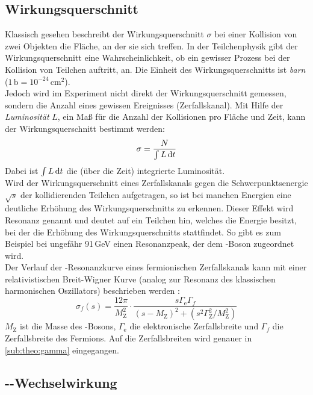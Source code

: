 \subsection{Wirkungsquerschnitt}
Klassisch gesehen beschreibt der Wirkungsquerschnitt $\sigma$ bei einer Kollision von zwei Objekten die Fläche, an der sie sich treffen.
In der Teilchenphysik gibt der Wirkungsquerschnitt eine Wahrscheinlichkeit, ob ein gewisser Prozess bei der Kollision von Teilchen auftritt, an.
Die Einheit des Wirkungsquerschnitts ist \emph{barn} ($1\,\text{b} = 10^{-24}\,\text{cm}^2$). \\
Jedoch wird im Experiment nicht direkt der Wirkungsquerschnitt gemessen, sondern die Anzahl eines gewissen Ereignisses (Zerfallskanal). Mit Hilfe
der \emph{Luminosität} $L$, ein Maß für die Anzahl der Kollisionen pro Fläche und Zeit, kann der Wirkungsquerschnitt bestimmt werden:
\begin{equation}
    \sigma = \frac{N}{\int L \, \mathrm{d} t}
\end{equation}
Dabei ist $\int L \, \mathrm{d} t$ die (über die Zeit) integrierte Luminosität. \\
Wird der Wirkungsquerschnitt eines Zerfallskanals gegen die Schwerpunktsenergie $\sqrt{s}$ der kollidierenden Teilchen aufgetragen, so ist
bei manchen Energien eine deutliche Erhöhung des Wirkungsquerschnitts zu erkennen. Dieser Effekt wird Resonanz genannt und deutet auf ein Teilchen
hin, welches die Energie besitzt, bei der die Erhöhung des Wirkungsquerschnitts stattfindet.
So gibt es zum Beispiel bei ungefähr 91\,GeV einen Resonanzpeak, der dem \Z-Boson zugeordnet wird. \\
Der Verlauf der  \Z-Resonanzkurve eines fermionischen Zerfallskanals kann mit einer relativistischen Breit-Wigner Kurve (analog zur Resonanz des
klassischen harmonischen Oszillators) beschrieben werden \cite{manual}:
\begin{equation}
    \label{eq:sigma:fermion}
    \sigma_f(s) = \frac{12 \pi}{M_\text{Z}^2} \cdot \frac{s \Gamma_\text{e} \Gamma_f}{ \left( s - M_\text{Z} \right)^2 + \left( s^2 \Gamma_\text{Z}^2 / M_\text{Z}^2 \right) }
\end{equation}
$M_\text{Z}$ ist die Masse des \Z-Bosons, $\Gamma_\text{e}$ die elektronische Zerfallsbreite und $\Gamma_f$ die Zerfallsbreite des Fermions. Auf
die Zerfallsbreiten wird genauer in \autoref{sub:theo:gamma} eingegangen.
\subsection{\texorpdfstring{\elp-\elm}{e+/e-}-Wechselwirkung}
